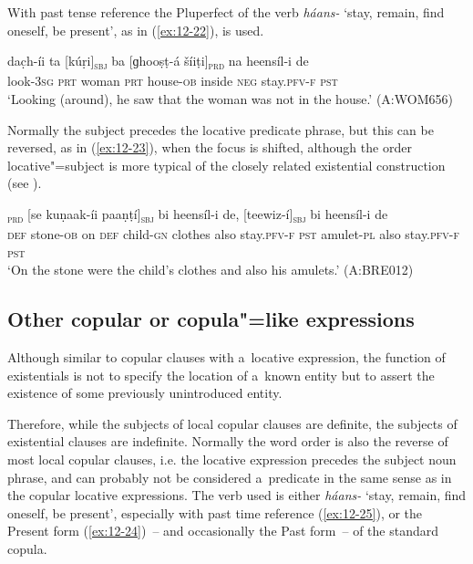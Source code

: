 With past tense reference the Pluperfect of the verb \textit{háans-} `stay, remain, find oneself, be present', as in (\ref{ex:12-22}), is used.

\begin{exe}
\ex
\label{ex:12-22}
\gll dac̣h-íi ta [kúṛi]\textsubscript{\textsc{sbj}} ba [ɡhooṣṭ-á šíiṭi]\textsubscript{\textsc{prd}} na heensíl-i de \\
look-3\textsc{sg} \textsc{prt} woman \textsc{prt} house-\textsc{ob} inside \textsc{neg} stay.\textsc{pfv-f} \textsc{pst} \\
\glt `Looking (around), he saw that the woman was not in the house.' (A:WOM656)
\end{exe}

Normally the subject precedes the locative predicate phrase, but this can be reversed, as in (\ref{ex:12-23}), when the focus is shifted, although the order locative"=subject is more typical of the closely related existential construction (see ).

\begin{exe}
\ex
\label{ex:12-23}
\textsubscript{\textsc{prd}} [se kuṇaak-íi paaṇṭí]\textsubscript{\textsc{sbj}} bi heensíl-i de, [teewiz-í]\textsubscript{\textsc{sbj}} bi heensíl-i de \\
\textsc{def} stone-\textsc{ob} on \textsc{def} child-\textsc{gn} clothes  also stay.\textsc{pfv-f}
\textsc{pst} amulet-\textsc{pl} also stay.\textsc{pfv-f} \textsc{pst} \\
\glt `On the stone were the child's clothes and also his amulets.' (A:BRE012)
\end{exe}

\subsection{Other copular or copula"=like expressions}
\label{subsec:12-1-4}

 Although similar to copular clauses with a~locative expression, the function of existentials is not to specify the location of a~known entity but to assert the existence of some previously unintroduced entity. 


Therefore, while the subjects of local copular clauses are definite, the subjects of existential clauses are indefinite. Normally the word order is also the reverse of most local copular clauses, i.e. the locative expression precedes the subject noun phrase, and can probably not be considered a~predicate in the same sense as in the copular locative expressions. The verb used is either \textit{háans-} `stay, remain, find oneself, be present', especially with past time reference (\ref{ex:12-25}), or the Present form (\ref{ex:12-24})~-- and occasionally the Past form~-- of the standard copula.

